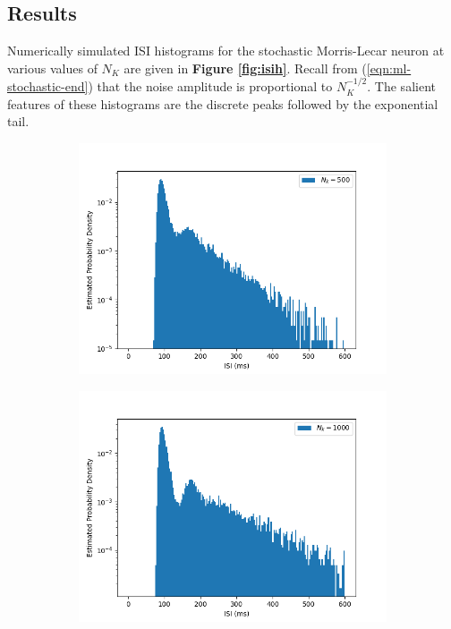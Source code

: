 \documentclass[letterpaper,12pt]{article}
\numberwithin{table}{section}
\numberwithin{figure}{section}
\numberwithin{equation}{section}
\newcommand{\reffig}[1]{\textbf{Figure \ref{#1}}}
\begin{document}
\begin{flushleft}
    \subsection{Results}

    Numerically simulated ISI histograms for the stochastic Morris-Lecar neuron at various values of $N_K$ are given in \reffig{fig:isih}. Recall from (\ref{eqn:ml-stochastic-end}) that the noise amplitude is proportional to $N_K^{-1/2}$. The salient features of these histograms are the discrete peaks followed by the exponential tail.

    \begin{figure}[!h]

        \centering

        \begin{subfigure}{0.75\textwidth}
            \includegraphics[width=\linewidth]{img/isih-nk500.jpg}
        \end{subfigure}
    
        \begin{subfigure}{0.75\textwidth}
            \includegraphics[width=\linewidth]{img/isih-nk1000.jpg}
        \end{subfigure}
        

\end{figure}
\end{flushleft}
\end{document}
